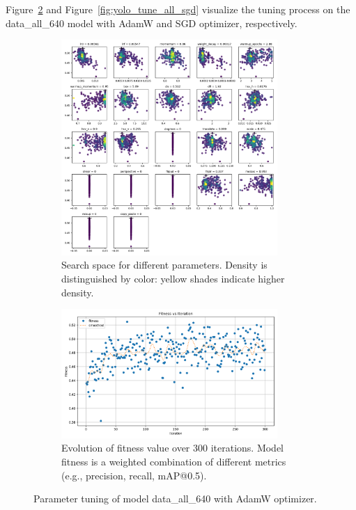 \documentclass[Master,MDS,english]{BASE/twbook} %
\begin{document}
Figure~\ref{fig:yolo_tune_all_adam} and Figure~\ref{fig:yolo_tune_all_sgd} visualize the tuning process on the data\_all\_640 model  with AdamW and SGD optimizer, respectively.

\begin{figure}[H]
\centering
\begin{subfigure}[t]{.5\textwidth}
  \centering
  \includegraphics[width=0.9\textwidth]{images/yolo/all/adam/tune_scatter_plots}
  \caption{Search space for different parameters. Density is distinguished by color: yellow shades indicate higher density.}
\end{subfigure}%
\begin{subfigure}[t]{.5\textwidth}
  \centering
  \includegraphics[width=0.9\textwidth]{images/yolo/all/adam/tune_fitness}
  \caption{Evolution of fitness value over 300 iterations. Model fitness is a weighted combination of different metrics (e.g., precision, recall, mAP@0.5).}
  \label{fig:images_from_videos}
\end{subfigure}
\caption{Parameter tuning of model data\_all\_640 with AdamW optimizer.}
\label{fig:yolo_tune_all_adam}
\end{figure}
\end{document}
